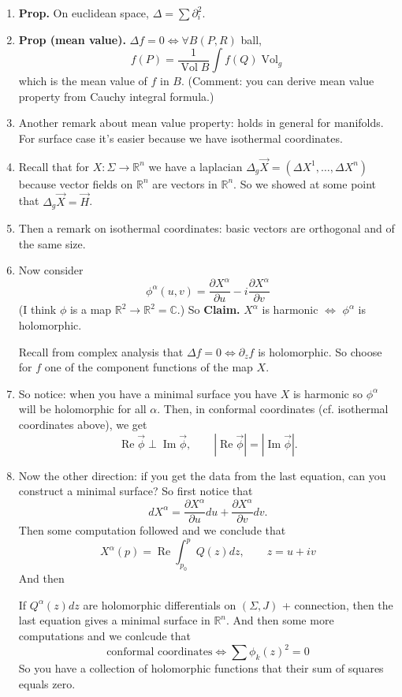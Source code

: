 \begin{enumerate}
\item \textbf{Prop.} On euclidean space, \(\Delta=\sum\partial_i^2\).
\item \textbf{Prop (mean value).} \(\Delta f=0 \iff \forall  B (P,R)\) ball,
	\[f(P)=\frac{1}{\operatorname{Vol} B}\int f(Q) \operatorname{Vol}_g\]
	which is the mean value of \(f\) in \(B\). (Comment: you can derive mean value property from Cauchy integral formula.)
\item Another remark about mean value property: holds in general for manifolds. For surface case it's easier because we have isothermal coordinates.
\item Recall that for \(X:\Sigma \to \mathbb{R}^n\) we have a laplacian \(\Delta_g \vec{X}=(\Delta X^1,\ldots,\Delta X^n)\) because vector fields on \(\mathbb{R}^n\) are vectors in \(\mathbb{R}^n\). So we showed at some point that \(\Delta_g \vec{X}=\vec{H}\).
\item Then a remark on isothermal coordinates: basic vectors are orthogonal and of the same size.
\item Now consider
	\[\phi^\alpha(u,v)=\frac{\partial X^\alpha}{\partial u}-i \frac{\partial X^\alpha}{\partial v}\]
(I think \(\phi\) is a map \(\mathbb{R}^2 \to \mathbb{R}^2=\mathbb{C}\).) So \textbf{Claim.} \(X^\alpha\) is harmonic \(\iff\) \(\phi^\alpha\) is holomorphic.

Recall from complex analysis that \(\Delta f=0 \iff \partial_z f\) is holomorphic. So choose for \(f\) one of the component functions of the map \(X\).

\item So notice: when you have a minimal surface you have \(X\) is harmonic so \(\phi^\alpha\) will be holomorphic for all \(\alpha\). Then, in conformal coordinates (cf. isothermal coordinates above), we get
	\[\operatorname{Re}\vec{\phi} \perp \operatorname{Im}\vec{\phi},\qquad |\operatorname{Re}\vec{\phi}|=|\operatorname{Im}\vec{\phi}|.\]
\item  Now the other direction: if you get the data from the last equation, can you construct a minimal surface? So first notice that
	\[d X^\alpha=\frac{\partial X^\alpha}{\partial u}du+\frac{\partial X^\alpha}{\partial v}dv.\]
	Then some computation followed and we conclude that
	\[X^\alpha(p)=\operatorname{Re}\int_{p_0}^pQ(z)dz, \qquad z=u+iv\]
And then
\begin{claim}\leavevmode
If \(Q^\alpha(z)dz\) are holomorphic differentials on \((\Sigma,J)\) + connection, then the last equation gives a minimal surface in \(\mathbb{R}^n\). And then some more computations and we conlcude that
\[\text{conformal coordinates} \iff \sum \phi_k(z)^2=0 \]
So you have a collection of holomorphic functions that their sum of squares equals zero.


\end{claim}
\end{enumerate}
